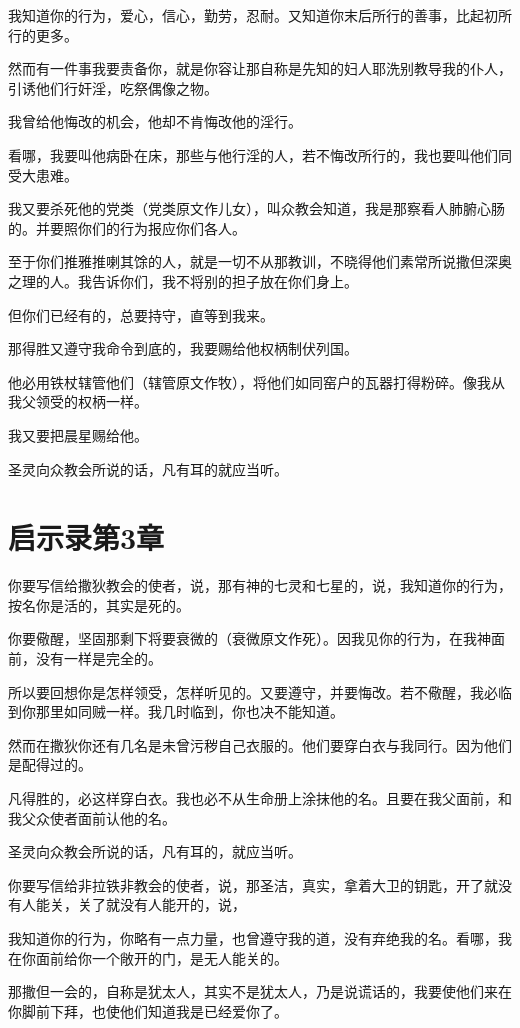 \documentclass[12pt,oneside]{book}
\begin{document}
我知道你的行为，爱心，信心，勤劳，忍耐。又知道你末后所行的善事，比起初所行的更多。

然而有一件事我要责备你，就是你容让那自称是先知的妇人耶洗别教导我的仆人，引诱他们行奸淫，吃祭偶像之物。

我曾给他悔改的机会，他却不肯悔改他的淫行。

看哪，我要叫他病卧在床，那些与他行淫的人，若不悔改所行的，我也要叫他们同受大患难。

我又要杀死他的党类（党类原文作儿女），叫众教会知道，我是那察看人肺腑心肠的。并要照你们的行为报应你们各人。

至于你们推雅推喇其馀的人，就是一切不从那教训，不晓得他们素常所说撒但深奥之理的人。我告诉你们，我不将别的担子放在你们身上。

但你们已经有的，总要持守，直等到我来。

那得胜又遵守我命令到底的，我要赐给他权柄制伏列国。

他必用铁杖辖管他们（辖管原文作牧），将他们如同窑户的瓦器打得粉碎。像我从我父领受的权柄一样。

我又要把晨星赐给他。

圣灵向众教会所说的话，凡有耳的就应当听。

\chapter{启示录第3章}
你要写信给撒狄教会的使者，说，那有神的七灵和七星的，说，我知道你的行为，按名你是活的，其实是死的。

你要儆醒，坚固那剩下将要衰微的（衰微原文作死）。因我见你的行为，在我神面前，没有一样是完全的。

所以要回想你是怎样领受，怎样听见的。又要遵守，并要悔改。若不儆醒，我必临到你那里如同贼一样。我几时临到，你也决不能知道。

然而在撒狄你还有几名是未曾污秽自己衣服的。他们要穿白衣与我同行。因为他们是配得过的。

凡得胜的，必这样穿白衣。我也必不从生命册上涂抹他的名。且要在我父面前，和我父众使者面前认他的名。

圣灵向众教会所说的话，凡有耳的，就应当听。

你要写信给非拉铁非教会的使者，说，那圣洁，真实，拿着大卫的钥匙，开了就没有人能关，关了就没有人能开的，说，

我知道你的行为，你略有一点力量，也曾遵守我的道，没有弃绝我的名。看哪，我在你面前给你一个敞开的门，是无人能关的。

那撒但一会的，自称是犹太人，其实不是犹太人，乃是说谎话的，我要使他们来在你脚前下拜，也使他们知道我是已经爱你了。
\end{document}

